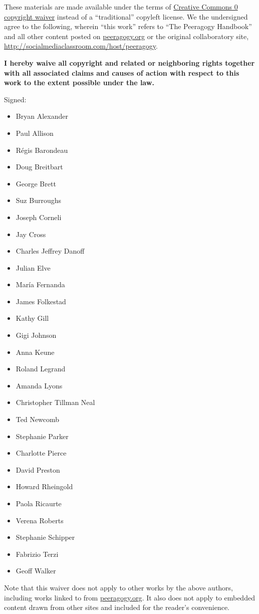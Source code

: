 These materials are made available under the terms of
\href{http://creativecommons.org/publicdomain/zero/1.0/}{Creative
Commons 0 copyright waiver} instead of a ``traditional'' copyleft
license. We the undersigned agree to the following, wherein ``this
work'' refers to ``The Peeragogy Handbook'' and all other content posted
on \href{http://peeragogy.org}{peeragogy.org} or the original
collaboratory site,
\href{http://socialmediaclassroom.com/host/peeragogy}{http://socialmediaclassroom.com/host/peeragogy}.

\textbf{I hereby waive all copyright and related or neighboring rights
together with all associated claims and causes of action with respect to
this work to the extent possible under the law.}

Signed:

\begin{itemize}
\item
  Bryan Alexander
\item
  Paul Allison
\item
  Régis Barondeau
\item
  Doug Breitbart
\item
  George Brett
\item
  Suz Burroughs
\item
  Joseph Corneli
\item
  Jay Cross
\item
  Charles Jeffrey Danoff
\item
  Julian Elve
\item
  María Fernanda
\item
  James Folkestad
\item
  Kathy Gill
\item
  Gigi Johnson
\item
  Anna Keune
\item
  Roland Legrand
\item
  Amanda Lyons
\item
  Christopher Tillman Neal
\item
  Ted Newcomb
\item
  Stephanie Parker
\item
  Charlotte Pierce
\item
  David Preston
\item
  Howard Rheingold
\item
  Paola Ricaurte
\item
  Verena Roberts
\item
  Stephanie Schipper
\item
  Fabrizio Terzi
\item
  Geoff Walker
\end{itemize}
Note that this waiver does not apply to other works by the above
authors, including works linked to from
\href{http://peeragogy.org}{peeragogy.org}. It also does not apply to
embedded content drawn from other sites and included for the reader's
convenience.

